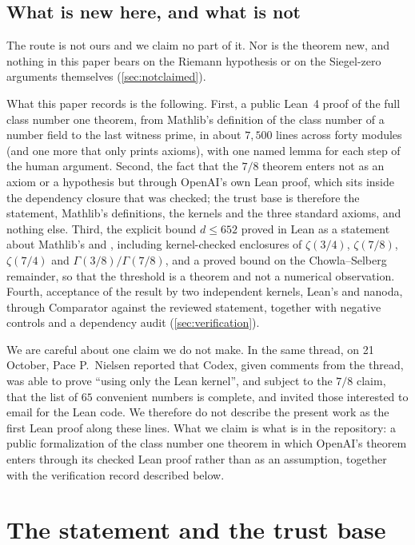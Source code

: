 \documentclass[11pt]{article}
\theoremstyle{definition}
\begin{document}
\subsection{What is new here, and what is not}

The route is not ours and we claim no part of it. Nor is the theorem new, and nothing in this paper bears on the Riemann hypothesis or on the Siegel-zero arguments themselves (\cref{sec:notclaimed}).

What this paper records is the following. First, a public Lean~4 proof of the full class number one theorem, from Mathlib's definition of the class number of a number field to the last witness prime, in about $7{,}500$ lines across forty modules (and one more that only prints axioms), with one named lemma for each step of the human argument. Second, the fact that the $7/8$ theorem enters not as an axiom or a hypothesis but through OpenAI's own Lean proof, which sits inside the dependency closure that was checked; the trust base is therefore the statement, Mathlib's definitions, the kernels and the three standard axioms, and nothing else. Third, the explicit bound $d \le 652$ proved in Lean as a statement about Mathlib's  and , including kernel-checked enclosures of $\zeta(3/4)$, $\zeta(7/8)$, $\zeta(7/4)$ and $\Gamma(3/8)/\Gamma(7/8)$, and a proved bound on the Chowla--Selberg remainder, so that the threshold is a theorem and not a numerical observation. Fourth, acceptance of the result by two independent kernels, Lean's and nanoda, through Comparator against the reviewed statement, together with negative controls and a dependency audit (\cref{sec:verification}).

We are careful about one claim we do not make. In the same thread, on 21 October, Pace P.~Nielsen reported that Codex, given comments from the thread, was able to prove ``using only the Lean kernel'', and subject to the $7/8$ claim, that the list of $65$ convenient numbers is complete, and invited those interested to email for the Lean code. We therefore do not describe the present work as the first Lean proof along these lines. What we claim is what is in the repository: a public formalization of the class number one theorem in which OpenAI's theorem enters through its checked Lean proof rather than as an assumption, together with the verification record described below.

\section{The statement and the trust base}\label{sec:statement}
\end{document}
